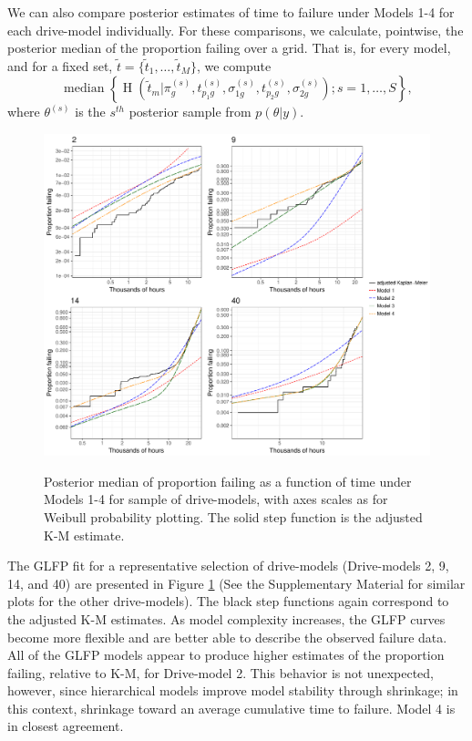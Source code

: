 \documentclass[aoas]{imsart}
\newcommand{\op}{\operatorname}
\begin{document}
We can also compare posterior estimates of time to failure under Models 1-4 for each drive-model individually.  For these comparisons, we calculate, pointwise, the posterior median of the proportion failing over a grid. That is, for every model, and for a fixed set, $\tilde{t}=\{\tilde{t}_1,\ldots,\tilde{t}_M\}$, we compute 
\begin{equation}
\label{pointwise-medians}
\op{median}\left\{\op{H}\left(\tilde{t}_m|\pi_{g}^{(s)},t_{p_{1}g}^{(s)},\sigma_{1g}^{(s)},t_{p_{2}g}^{(s)},\sigma_{2g}^{(s)}\right);s=1,\ldots,S \right\},
\end{equation}
where $\theta^{(s)}$ is the $s^{th}$ posterior sample from $p(\theta|y)$.

\begin{figure}[H]
{\centering
\includegraphics[width=\textwidth]{single-drive-4-Models-ex}}
\caption{Posterior median of proportion failing as a function of time under Models 1-4 for sample of drive-models, with axes scales as for Weibull probability plotting.  The solid step function is the adjusted K-M estimate.}
\label{fig:mod_comp_leg}
\end{figure}

The GLFP fit for a representative selection of drive-models (Drive-models 2, 9, 14, and 40) are presented in Figure \ref{fig:mod_comp_leg} (See the Supplementary Material for similar plots for the other drive-models).  The black step functions again correspond to the adjusted K-M estimates.  As model complexity increases, the GLFP curves become more flexible and are better able to describe the observed failure data.  All of the GLFP models appear to produce higher estimates of the proportion failing, relative to K-M, for Drive-model 2. This behavior is not unexpected, however, since hierarchical models improve model stability through shrinkage; in this context, shrinkage toward an average cumulative time to failure. Model 4 is in closest agreement. 
\end{document}
